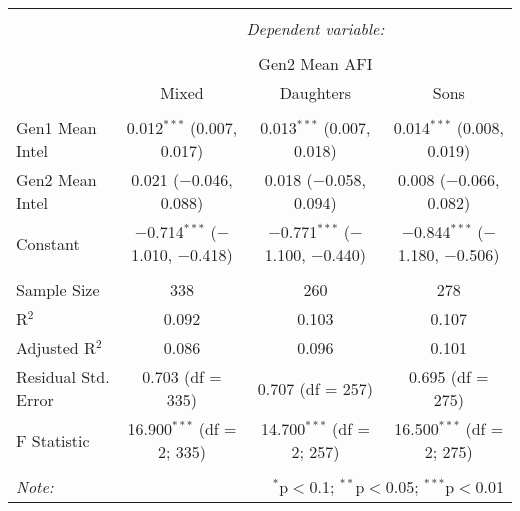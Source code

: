 
\begingroup 
\small 
\begin{tabular}{@{\extracolsep{1pt}}lccc} 
\\[-1.8ex]\hline 
\hline \\[-1.8ex] 
 & \multicolumn{3}{c}{\textit{Dependent variable:}} \\ 
\cline{2-4} 
\\[-1.8ex] & \multicolumn{3}{c}{Gen2 Mean AFI} \\ 
 & Mixed & Daughters & Sons \\ 
\hline \\[-1.8ex] 
 Gen1 Mean Intel & 0.012$^{***}$ (0.007, 0.017) & 0.013$^{***}$ (0.007, 0.018) & 0.014$^{***}$ (0.008, 0.019) \\ 
  Gen2 Mean Intel & 0.021 ($-$0.046, 0.088) & 0.018 ($-$0.058, 0.094) & 0.008 ($-$0.066, 0.082) \\ 
  Constant & $-$0.714$^{***}$ ($-$1.010, $-$0.418) & $-$0.771$^{***}$ ($-$1.100, $-$0.440) & $-$0.844$^{***}$ ($-$1.180, $-$0.506) \\ 
 \hline \\[-1.8ex] 
Sample Size & 338 & 260 & 278 \\ 
R$^{2}$ & 0.092 & 0.103 & 0.107 \\ 
Adjusted R$^{2}$ & 0.086 & 0.096 & 0.101 \\ 
Residual Std. Error & 0.703 (df = 335) & 0.707 (df = 257) & 0.695 (df = 275) \\ 
F Statistic & 16.900$^{***}$ (df = 2; 335) & 14.700$^{***}$ (df = 2; 257) & 16.500$^{***}$ (df = 2; 275) \\ 
\hline 
\hline \\[-1.8ex] 
\textit{Note:}  & \multicolumn{3}{r}{$^{*}$p$<$0.1; $^{**}$p$<$0.05; $^{***}$p$<$0.01} \\ 
\end{tabular} 
\endgroup 

